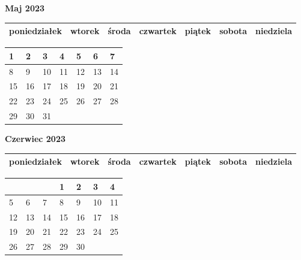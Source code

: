 \clearpage

\begin{landscape}
    \begin{center}
        \textbf{\huge{Maj 2023}}
    \end{center}

    \vspace{-3mm}

    \thispagestyle{empty}
    \noindent
    \begin{tabularx}{28.7cm}{|Y|Y|Y|Y|Y|Y|Y|}
        \hline
poniedziałek & wtorek & środa & czwartek & piątek & sobota & niedziela \\ [-0.5mm]
        \hline
    \end{tabularx}

    \vspace{-0.5mm}

    \noindent
    \begin{tabularx}{28.7cm}{|X|X|X|X|X|X|X|}
        \hline
1 & 2 & 3 & 4 & 5 & 6 & 7 \\ [31.0mm]
\hline
8 & 9 & 10 & 11 & 12 & 13 & 14 \\ [31.0mm]
\hline
15 & 16 & 17 & 18 & 19 & 20 & 21 \\ [31.0mm]
\hline
22 & 23 & 24 & 25 & 26 & 27 & 28 \\ [31.0mm]
\hline
29 & 30 & 31 & & & & \\ [31.0mm]
\hline

    \end{tabularx}
\end{landscape}

\clearpage

\begin{landscape}
    \begin{center}
        \textbf{\huge{Czerwiec 2023}}
    \end{center}

    \vspace{-3mm}

    \thispagestyle{empty}
    \noindent
    \begin{tabularx}{28.7cm}{|Y|Y|Y|Y|Y|Y|Y|}
        \hline
poniedziałek & wtorek & środa & czwartek & piątek & sobota & niedziela \\ [-0.5mm]
        \hline
    \end{tabularx}

    \vspace{-0.5mm}

    \noindent
    \begin{tabularx}{28.7cm}{|X|X|X|X|X|X|X|}
        \hline
& & & 1 & 2 & 3 & 4 \\ [31.0mm]
\hline
5 & 6 & 7 & 8 & 9 & 10 & 11 \\ [31.0mm]
\hline
12 & 13 & 14 & 15 & 16 & 17 & 18 \\ [31.0mm]
\hline
19 & 20 & 21 & 22 & 23 & 24 & 25 \\ [31.0mm]
\hline
26 & 27 & 28 & 29 & 30 & & \\ [31.0mm]
\hline

    \end{tabularx}
\end{landscape}

